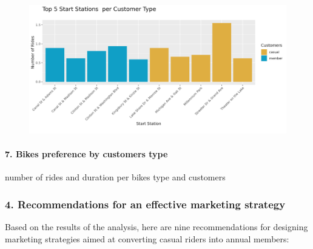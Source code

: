 \documentclass[
]{article}
\begin{document}
\begin{figure}
\includegraphics[width=1\linewidth]{outputs/img/bar_chart__number_of_rides_per_customer_by_top_5_start_station} \end{figure}

\hypertarget{bikes-preference-by-customers-type}{%
\paragraph{7. Bikes preference by customers
type}\label{bikes-preference-by-customers-type}}

number of rides and duration per bikes type and customers

\hypertarget{recommendations-for-an-effective-marketing-strategy}{%
\subsubsection{4. Recommendations for an effective marketing
strategy}\label{recommendations-for-an-effective-marketing-strategy}}

Based on the results of the analysis, here are nine recommendations for
designing marketing strategies aimed at converting casual riders into
annual members:
\end{document}
